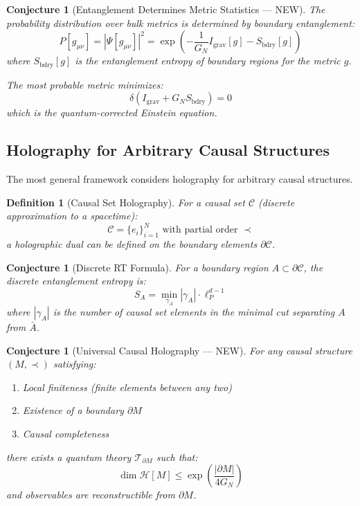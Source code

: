 \documentclass[12pt,a4paper]{article}
\newtheorem{conjecture}[theorem]{Conjecture}
\newtheorem{definition}[theorem]{Definition}
\begin{document}
\begin{conjecture}[Entanglement Determines Metric Statistics --- NEW]
The probability distribution over bulk metrics is determined by boundary entanglement:
\begin{equation}
P[g_{\mu\nu}] = |\Psi[g_{\mu\nu}]|^2 = \exp\left( -\frac{1}{G_N} I_{\text{grav}}[g] - S_{\text{bdry}}[g] \right)
\end{equation}
where $S_{\text{bdry}}[g]$ is the entanglement entropy of boundary regions for the metric $g$.

The most probable metric minimizes:
\begin{equation}
\delta\left( I_{\text{grav}} + G_N S_{\text{bdry}} \right) = 0
\end{equation}
which is the quantum-corrected Einstein equation.
\end{conjecture}

\subsection{Holography for Arbitrary Causal Structures}

The most general framework considers holography for arbitrary causal structures.

\begin{definition}[Causal Set Holography]
For a causal set $\mathcal{C}$ (discrete approximation to a spacetime):
\begin{equation}
\mathcal{C} = \{e_i\}_{i=1}^N \text{ with partial order } \prec
\end{equation}
a holographic dual can be defined on the boundary elements $\partial \mathcal{C}$.
\end{definition}

\begin{conjecture}[Discrete RT Formula]
For a boundary region $A \subset \partial \mathcal{C}$, the discrete entanglement entropy is:
\begin{equation}
S_A = \min_{\gamma_A} |\gamma_A| \cdot \ell_P^{d-1}
\end{equation}
where $|\gamma_A|$ is the number of causal set elements in the minimal cut separating $A$ from $\bar{A}$.
\end{conjecture}

\begin{conjecture}[Universal Causal Holography --- NEW]
For \textit{any} causal structure $(M, \prec)$ satisfying:
\begin{enumerate}
    \item Local finiteness (finite elements between any two)
    \item Existence of a boundary $\partial M$ 
    \item Causal completeness
\end{enumerate}
there exists a quantum theory $\mathcal{T}_{\partial M}$ such that:
\begin{equation}
\dim \mathcal{H}[M] \leq \exp\left( \frac{|\partial M|}{4G_N} \right)
\end{equation}
and observables are reconstructible from $\partial M$.
\end{conjecture}
\end{document}
